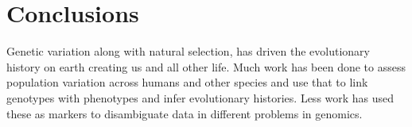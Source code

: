 %
\chapter{Conclusions}

\ifpdf
    \graphicspath{{Chapter5/Figs/Raster/}{Chapter5/Figs/PDF/}{Chapter5/Figs/}}
\else
    \graphicspath{{Chapter5/Figs/Vector/}{Chapter5/Figs/}}
\fi


\par{
Genetic variation along with natural selection, has driven the evolutionary history on earth creating us and all other life. Much work has been done to assess population variation across humans and other species and use that to link genotypes with phenotypes and infer evolutionary histories. Less work has used these as markers to disambiguate data in different problems in genomics.
} 
